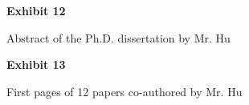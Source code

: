 \documentclass{article}
\begin{document}
\vspace*{\fill}
\begin{center}

{\LARGE \bf
Exhibit 12
}

\vspace{10\baselineskip}

{\large Abstract of the Ph.D. dissertation by Mr. Hu}

\end{center}
\vspace*{\fill}


% 



\vspace*{\fill}
\begin{center}

{\LARGE \bf
Exhibit 13
}

\vspace{10\baselineskip}

{\large  First pages of 12 papers co-authored by Mr. Hu}

\end{center}
\vspace*{\fill}


% 

% 

% 

% 

% 

% 

% 

% 

% 

% 

% 
\end{document}
